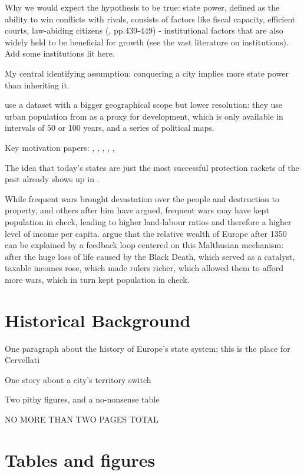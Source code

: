 \documentclass{article}
\begin{document}
Why we would expect the hypothesis to be true: state power, defined as the ability to win conflicts with rivals, consists of factors like fiscal capacity, efficient courts, law-abiding citizens (\citealp{levine2021}, pp.439-449) - institutional factors that are also widely held to be beneficial for growth (see the vast literature on institutions). Add some institutions lit here.


My central identifying assumption: conquering a city implies more state power than inheriting it.

\cite{schoenholzer2022} use a dataset with a bigger geographical scope but lower resolution: they use urban population from \cite{bairoch1988} as a proxy for development, which is only available in intervals of 50 or 100 years, and a series of political maps. 




Key motivation papers: \cite{levine2013, levine2021}, \cite{diamond1997}, \cite{schoenholzer2022}, \cite{cervellati2022}, \cite{voigtlnder2013}, \cite{tilly1985}

The idea that today's states are just the most successful protection rackets of the past already shows up in \cite{tilly1985}.

While frequent wars brought devastation over the people and destruction to property, \cite{malthus1798} and others after him have argued, frequent wars may have kept population in check, leading to higher land-labour ratios and therefore a higher level of income per capita. \cite{voigtlnder2013} argue that the relative wealth of Europe after 1350 can be explained by a feedback loop centered on this Malthusian mechanism: after the huge loss of life caused by the Black Death, which served as a catalyst, taxable incomes rose, which made rulers richer, which allowed them to afford more wars, which in turn kept population in check.


\section{Historical Background}


One paragraph about the history of Europe's state system; this is the place for Cervellati

One story about a city's territory switch

Two pithy figures, and a no-nonsense table

NO MORE THAN TWO PAGES TOTAL






\newpage
\onehalfspacing



\newpage
\section*{Tables and figures}
\end{document}
